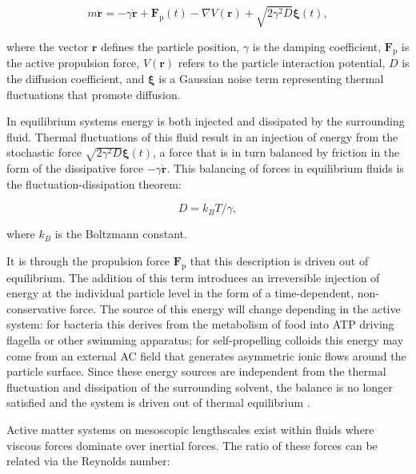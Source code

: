\begin{equation}
	m \ddot{\mathbf{r}}=-\gamma \dot{\mathbf{r}}+\mathbf{F}_{\mathrm{p}}(t)-\nabla V(\mathbf{r})+\sqrt{2 \gamma^{2} D} \mathbf{\xi}(t),
    \label{eq:ABP3D}
\end{equation}

\noindent where the vector $\mathbf{r}$ defines the particle position, $\gamma$ is the damping coefficient, $\mathbf{F}_{\mathrm{p}}$ is the active propulsion force, $V(\mathbf{r})$ refers to the particle interaction potential, $D$ is the diffusion coefficient, and $\mathbf{\xi}$ is a Gaussian noise term representing thermal fluctuations that  promote diffusion.

In equilibrium systems energy is both injected and dissipated by the surrounding fluid. Thermal fluctuations of this fluid result in an injection of energy from the stochastic force $\sqrt{2 \gamma^{2} D} \mathbf{\xi}(t)$, a force that is in turn balanced by friction in the form of the dissipative force $-\gamma \dot{\mathbf{r}}$. This balancing of forces in equilibrium fluids is the fluctuation-dissipation theorem:

\begin{equation}
	D = k_B T / \gamma ,
\end{equation} 

\noindent where $k_B$ is the Boltzmann constant. 

It is through the propulsion force  $\mathbf{F}_{\mathrm{p}}$ that this description is driven out of equilibrium. The addition of this term introduces an irreversible injection of energy at the individual particle level in the form of a time-dependent, non-conservative force. The source of this energy will change depending in the active system: for bacteria this derives from the metabolism of food into ATP driving flagella or other swimming apparatus; for self-propelling colloids this energy may come from an external AC field that generates asymmetric ionic flows around the particle surface. Since these energy sources are independent from the thermal fluctuation and dissipation of the surrounding solvent, the balance is no longer satisfied and the system is driven out of thermal equilibrium \cite{obyrne2022a}. 





Active matter systems on mesoscopic lengthscales exist within fluids where viscous forces dominate over inertial forces. The ratio of these forces can be related via the Reynolds number:

